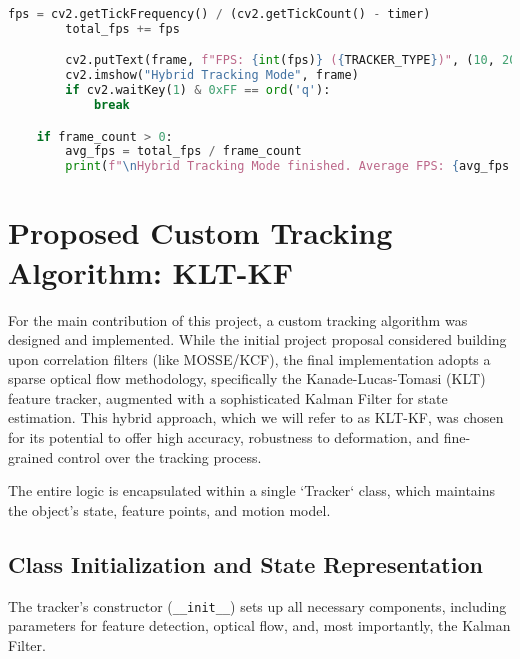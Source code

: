 \documentclass[12pt, a4paper]{article}
\begin{document}
\begin{lstlisting}[language=Python, caption={The advanced hybrid tracking loop with re-detection.}, label={lst:hybrid_loop}]
        fps = cv2.getTickFrequency() / (cv2.getTickCount() - timer)
        total_fps += fps

        cv2.putText(frame, f"FPS: {int(fps)} ({TRACKER_TYPE})", (10, 20), cv2.FONT_HERSHEY_SIMPLEX, 0.6, (0,0,255), 2)
        cv2.imshow("Hybrid Tracking Mode", frame)
        if cv2.waitKey(1) & 0xFF == ord('q'):
            break

    if frame_count > 0:
        avg_fps = total_fps / frame_count
        print(f"\nHybrid Tracking Mode finished. Average FPS: {avg_fps:.2f}")
\end{lstlisting}

\section{Proposed Custom Tracking Algorithm: KLT-KF}
For the main contribution of this project, a custom tracking algorithm was designed and implemented. While the initial project proposal considered building upon correlation filters (like MOSSE/KCF), the final implementation adopts a sparse optical flow methodology, specifically the Kanade-Lucas-Tomasi (KLT) feature tracker, augmented with a sophisticated Kalman Filter for state estimation. This hybrid approach, which we will refer to as KLT-KF, was chosen for its potential to offer high accuracy, robustness to deformation, and fine-grained control over the tracking process.

The entire logic is encapsulated within a single `Tracker` class, which maintains the object's state, feature points, and motion model.

\subsection{Class Initialization and State Representation}
The tracker's constructor (\texttt{\_\_init\_\_}) sets up all necessary components, including parameters for feature detection, optical flow, and, most importantly, the Kalman Filter.
\end{document}
